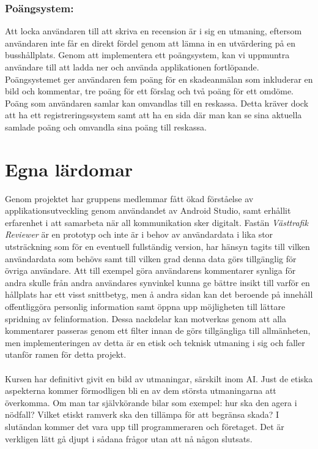 \documentclass{article}
\begin{document}
\subsubsection*{Poängsystem: }
Att locka användaren till att skriva en recension är i sig en utmaning, eftersom användaren inte får en direkt fördel genom att lämna in en utvärdering på en busshållplats. Genom att implementera ett poängsystem, kan vi uppmuntra användare till att ladda ner och använda applikationen fortlöpande. Poängsystemet ger användaren fem poäng för en skadeanmälan som inkluderar en bild och kommentar, tre poäng för ett förslag och två poäng för ett omdöme. Poäng som användaren samlar kan omvandlas till en reskassa. Detta kräver dock att ha ett registreringssystem samt att ha en sida där man kan se sina aktuella samlade poäng och omvandla sina poäng till reskassa.

\section*{Egna lärdomar}
Genom projektet har gruppens medlemmar fått ökad förståelse av applikationsutveckling genom användandet av Android Studio, samt erhållit erfarenhet i att samarbeta när all kommunikation sker digitalt. Fastän \textit{Västtrafik Reviewer} är en prototyp och inte är i behov av användardata i lika stor utsträckning som för en eventuell fullständig version, har hänsyn tagits till vilken användardata som behövs samt till vilken grad denna data görs tillgänglig för övriga användare. Att till exempel göra användarens kommentarer synliga för andra skulle från andra användares synvinkel kunna ge bättre insikt till varför en hållplats har ett visst snittbetyg, men å andra sidan kan det beroende på innehåll offentliggöra personlig information samt öppna upp möjligheten till lättare spridning av felinformation. Dessa nackdelar kan motverkas genom att alla kommentarer passeras genom ett filter innan de görs tillgängliga till allmänheten, men implementeringen av detta är en etisk och teknisk utmaning i sig och faller utanför ramen för detta projekt.
\\\\
Kursen har definitivt givit en bild av utmaningar, särskilt inom AI. Just de etiska aspekterna kommer förmodligen bli en av dem största utmaningarna att överkomma. Om man tar självkörande bilar som exempel: hur ska den agera i nödfall? Vilket etiskt ramverk ska den tillämpa för att begränsa skada? I slutändan kommer det vara upp till programmeraren och företaget. Det är verkligen lätt gå djupt i sådana frågor utan att nå någon slutsats.
\end{document}

